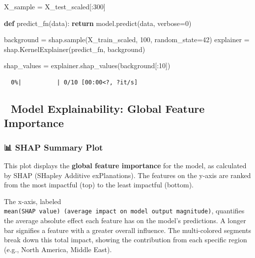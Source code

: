 \documentclass[
  letterpaper,
  DIV=11,
  numbers=noendperiod]{scrartcl}
\newenvironment{Shaded}{\begin{snugshade}}{\end{snugshade}}
\newcommand{\ControlFlowTok}[1]{\textcolor[rgb]{0.00,0.23,0.31}{\textbf{#1}}}
\newcommand{\DecValTok}[1]{\textcolor[rgb]{0.68,0.00,0.00}{#1}}
\newcommand{\KeywordTok}[1]{\textcolor[rgb]{0.00,0.23,0.31}{\textbf{#1}}}
\newcommand{\NormalTok}[1]{\textcolor[rgb]{0.00,0.23,0.31}{#1}}
\newcommand{\OperatorTok}[1]{\textcolor[rgb]{0.37,0.37,0.37}{#1}}
\begin{document}
\begin{Shaded}
\begin{Highlighting}[]
\NormalTok{X\_sample }\OperatorTok{=}\NormalTok{ X\_test\_scaled[:}\DecValTok{300}\NormalTok{]}
\end{Highlighting}
\end{Shaded}

\begin{Shaded}
\begin{Highlighting}[]
\KeywordTok{def}\NormalTok{ predict\_fn(data):}
    \ControlFlowTok{return}\NormalTok{ model.predict(data, verbose}\OperatorTok{=}\DecValTok{0}\NormalTok{)}

\NormalTok{background }\OperatorTok{=}\NormalTok{ shap.sample(X\_train\_scaled, }\DecValTok{100}\NormalTok{, random\_state}\OperatorTok{=}\DecValTok{42}\NormalTok{)}
\NormalTok{explainer }\OperatorTok{=}\NormalTok{ shap.KernelExplainer(predict\_fn, background)}
\end{Highlighting}
\end{Shaded}

\begin{Shaded}
\begin{Highlighting}[]
\NormalTok{shap\_values }\OperatorTok{=}\NormalTok{ explainer.shap\_values(background[:}\DecValTok{10}\NormalTok{])}
\end{Highlighting}
\end{Shaded}

\begin{verbatim}
  0%|          | 0/10 [00:00<?, ?it/s]
\end{verbatim}

\subsection{🧠 Model Explainability: Global Feature
Importance}\label{model-explainability-global-feature-importance}

\subsubsection{📊 SHAP Summary Plot}\label{shap-summary-plot}

This plot displays the \textbf{global feature importance} for the model,
as calculated by SHAP (SHapley Additive exPlanations). The features on
the y-axis are ranked from the most impactful (top) to the least
impactful (bottom).

The x-axis, labeled
\texttt{mean(\textbar{}SHAP\ value\textbar{})\ (average\ impact\ on\ model\ output\ magnitude)},
quantifies the average absolute effect each feature has on the model's
predictions. A longer bar signifies a feature with a greater overall
influence. The multi-colored segments break down this total impact,
showing the contribution from each specific region (e.g., North America,
Middle East).
\end{document}
